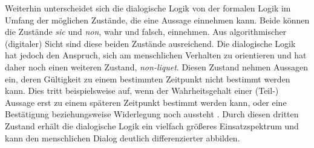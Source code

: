 \documentclass[11pt,a4paper,bibtotocnumbered]{scrreprt}
\begin{document}
Weiterhin unterscheidet sich die dialogische Logik von der formalen Logik im Umfang der möglichen Zustände, die eine Aussage einnehmen kann. Beide können die Zustände \emph{sic} und \emph{non}, wahr und falsch, einnehmen. Aus algorithmischer (digitaler) Sicht sind diese beiden Zustände ausreichend. Die dialogische Logik hat jedoch den Anspruch, sich am menschlichen Verhalten zu orientieren und hat daher noch einen weiteren Zustand, \emph{non-liquet}. Diesen Zustand nehmen Aussagen ein, deren Gültigkeit zu einem bestimmten Zeitpunkt nicht bestimmt werden kann. Dies tritt beispielsweise auf, wenn der Wahrheitsgehalt einer (Teil-) Aussage erst zu einem späteren Zeitpunkt bestimmt werden kann, oder eine Bestätigung beziehungsweise Widerlegung noch aussteht \cite[Folie 8]{OrtnerDL}. Durch diesen dritten Zustand erhält die dialogische Logik ein vielfach größeres Einsatzspektrum und kann den menschlichen Dialog deutlich differenzierter abbilden.
\end{document}
